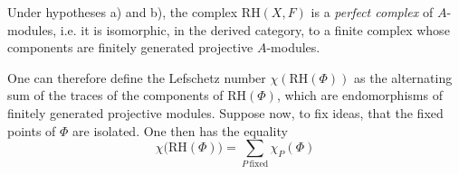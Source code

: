 Under hypotheses a) and b), the complex $\mathrm{RH}(X,F)$ is a
\emph{perfect complex} of $A$-modules, i.e. it is isomorphic, in the derived
category, to a finite complex whose components are finitely generated
projective $A$-modules.

One can therefore define the Lefschetz number $\chi(\mathrm{RH}(\Phi))$ as
the alternating sum of the traces of the components of
$\mathrm{RH}(\Phi)$, which are endomorphisms of finitely generated
projective modules. Suppose now, to fix ideas, that the fixed points of
$\Phi$ are isolated. One then has the equality
\begingroup
\makeatletter
\tagsleft@true
\let\veqno\@@leqno
\makeatother
\begin{equation}
\chi\bigl(\mathrm{RH}(\Phi)\bigr)
=\sum_{P\ \mathrm{fixed}}\chi_P(\Phi)
\tag{Lef}
\end{equation}
\endgroup
